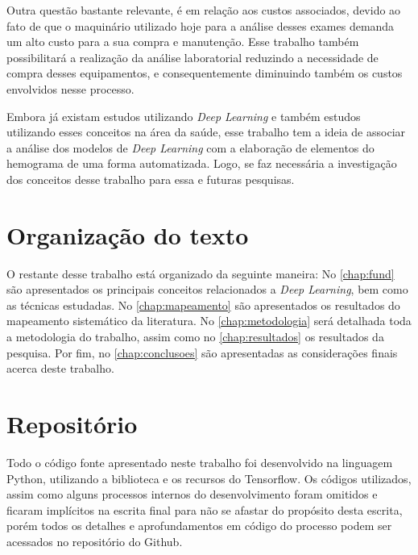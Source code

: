 Outra questão bastante relevante, é em relação aos custos associados, devido ao fato de que o maquinário utilizado hoje para a análise desses exames demanda um alto custo para a sua compra e manutenção. Esse trabalho também possibilitará a realização da análise laboratorial reduzindo a necessidade de compra desses equipamentos, e consequentemente diminuindo também os custos envolvidos nesse processo.

Embora já existam estudos utilizando \emph{Deep Learning} e também estudos utilizando esses conceitos na área da saúde, esse trabalho tem a ideia de associar a análise dos modelos de \emph{Deep Learning} com a elaboração de elementos do hemograma de uma forma automatizada. Logo, se faz necessária a investigação dos conceitos desse trabalho para essa e futuras pesquisas.

\section{Organização do texto}
\label{sec:organizacao}
O restante desse trabalho está organizado da seguinte maneira: No \autoref{chap:fund} são apresentados os principais conceitos relacionados a \emph{Deep Learning}, bem como as técnicas estudadas. No \autoref{chap:mapeamento} são apresentados os resultados do mapeamento sistemático da literatura. No \autoref{chap:metodologia} será detalhada toda a metodologia do trabalho, assim como no \autoref{chap:resultados} os resultados da pesquisa. Por fim, no \autoref{chap:conclusoes} são apresentadas as considerações finais acerca deste trabalho.

\section{Repositório}
Todo o código fonte apresentado neste trabalho foi desenvolvido na linguagem Python, utilizando a biblioteca e os recursos do Tensorflow. Os códigos utilizados, assim como alguns processos internos do desenvolvimento foram omitidos e ficaram implícitos na escrita final para não se afastar do propósito desta escrita, porém todos os detalhes e aprofundamentos em código do processo podem ser acessados no repositório do Github. \cite{anthonyGithub}
